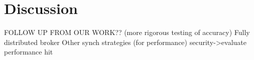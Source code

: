 \section{Discussion}
\label{discussion}
FOLLOW UP FROM OUR WORK??
(more rigorous testing of accuracy)
Fully distributed broker
Other synch strategies (for performance)
security->evaluate performance hit
